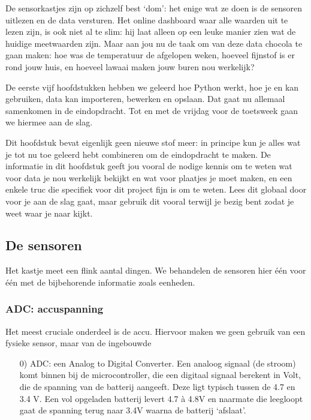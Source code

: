 \documentclass[a4paper,11pt, fleqn]{article}
\begin{document}
De sensorkastjes zijn op zichzelf best `dom': het enige wat ze doen is de sensoren uitlezen en de data versturen. Het online dashboard waar alle waarden uit te lezen zijn, is ook niet al te slim: hij laat alleen op een leuke manier zien wat de huidige meetwaarden zijn. Maar aan jou nu de taak om van deze data chocola te gaan maken: hoe was de temperatuur de afgelopen weken, hoeveel fijnstof is er rond jouw huis, en hoeveel lawaai maken jouw buren nou werkelijk?

De eerste vijf hoofdstukken hebben we geleerd hoe Python werkt, hoe je  en  kan gebruiken, data kan importeren, bewerken en opslaan. Dat gaat nu allemaal samenkomen in de eindopdracht. Tot en met de vrijdag voor de toetsweek gaan we hiermee aan de slag.

Dit hoofdstuk bevat eigenlijk geen nieuwe stof meer: in principe kun je alles wat je tot nu toe geleerd hebt combineren om de eindopdracht te maken. De informatie in dit hoofdstuk geeft jou vooral de nodige kennis om te weten wat voor data je nou werkelijk bekijkt en wat voor plaatjes je moet maken, en een enkele truc die specifiek voor dit project fijn is om te weten. Lees dit globaal door voor je aan de slag gaat, maar gebruik dit vooral terwijl je bezig bent zodat je weet waar je naar kijkt.

\subsection{De sensoren}
Het kastje meet een flink aantal dingen. We behandelen de sensoren hier \'e\'en voor \'e\'en met de bijbehorende informatie zoals eenheden.

\subsubsection{ADC: accuspanning}
Het meest cruciale onderdeel is de accu. Hiervoor maken we geen gebruik van een fysieke sensor, maar van de ingebouwde
\begin{itemize}
	\item[0)] ADC: een Analog to Digital Converter. Een analoog signaal (de stroom) komt binnen bij de microcontroller, die een digitaal signaal berekent in Volt, die de spanning van de batterij aangeeft. Deze ligt typisch tussen de 4.7 en 3.4 V. Een vol opgeladen batterij levert 4.7 \`a 4.8V en naarmate die leegloopt gaat de spanning terug naar 3.4V waarna de batterij `afslaat'.
\end{itemize}
\end{document}
